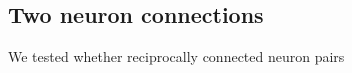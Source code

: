 \clearpage
\pagebreak
\newpage

\subsection*{Two neuron connections}

We tested whether reciprocally connected neuron pairs 


